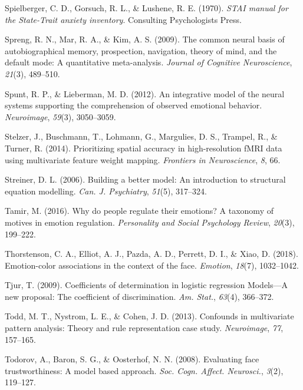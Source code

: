 \documentclass[11pt,american,a4paper,oneside,]{memoir} %
\begin{document}
\leavevmode\hypertarget{ref-Spielberger1970-td}{}%
Spielberger, C. D., Gorsuch, R. L., \& Lushene, R. E. (1970). \emph{STAI manual for the State-Trait anxiety inventory}. Consulting Psychologists Press.

\leavevmode\hypertarget{ref-spreng2009common}{}%
Spreng, R. N., Mar, R. A., \& Kim, A. S. (2009). The common neural basis of autobiographical memory, prospection, navigation, theory of mind, and the default mode: A quantitative meta-analysis. \emph{Journal of Cognitive Neuroscience}, \emph{21}(3), 489--510.

\leavevmode\hypertarget{ref-spunt2012integrative}{}%
Spunt, R. P., \& Lieberman, M. D. (2012). An integrative model of the neural systems supporting the comprehension of observed emotional behavior. \emph{Neuroimage}, \emph{59}(3), 3050--3059.

\leavevmode\hypertarget{ref-stelzer2014prioritizing}{}%
Stelzer, J., Buschmann, T., Lohmann, G., Margulies, D. S., Trampel, R., \& Turner, R. (2014). Prioritizing spatial accuracy in high-resolution fMRI data using multivariate feature weight mapping. \emph{Frontiers in Neuroscience}, \emph{8}, 66.

\leavevmode\hypertarget{ref-Streiner2006-ze}{}%
Streiner, D. L. (2006). Building a better model: An introduction to structural equation modelling. \emph{Can. J. Psychiatry}, \emph{51}(5), 317--324.

\leavevmode\hypertarget{ref-tamir2016people}{}%
Tamir, M. (2016). Why do people regulate their emotions? A taxonomy of motives in emotion regulation. \emph{Personality and Social Psychology Review}, \emph{20}(3), 199--222.

\leavevmode\hypertarget{ref-Thorstenson2018-io}{}%
Thorstenson, C. A., Elliot, A. J., Pazda, A. D., Perrett, D. I., \& Xiao, D. (2018). Emotion-color associations in the context of the face. \emph{Emotion}, \emph{18}(7), 1032--1042.

\leavevmode\hypertarget{ref-Tjur2009-dp}{}%
Tjur, T. (2009). Coefficients of determination in logistic regression Models---A new proposal: The coefficient of discrimination. \emph{Am. Stat.}, \emph{63}(4), 366--372.

\leavevmode\hypertarget{ref-Todd2013-sd}{}%
Todd, M. T., Nystrom, L. E., \& Cohen, J. D. (2013). Confounds in multivariate pattern analysis: Theory and rule representation case study. \emph{Neuroimage}, \emph{77}, 157--165.

\leavevmode\hypertarget{ref-Todorov2008-eb}{}%
Todorov, A., Baron, S. G., \& Oosterhof, N. N. (2008). Evaluating face trustworthiness: A model based approach. \emph{Soc. Cogn. Affect. Neurosci.}, \emph{3}(2), 119--127.
\end{document}
